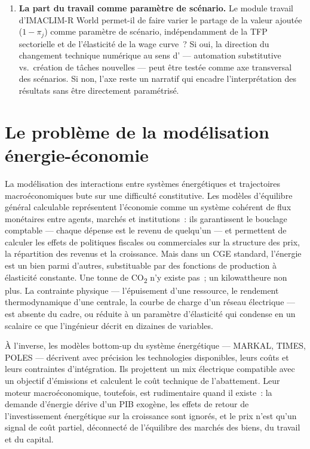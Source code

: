 \begin{enumerate}
\item \textbf{La part du travail comme paramètre de scénario.} Le module travail d'IMACLIM-R World permet-il de faire varier le partage de la valeur ajoutée ($1-\pi_j$) comme paramètre de scénario, indépendamment de la TFP sectorielle et de l'élasticité de la wage curve~? Si oui, la direction du changement technique numérique au sens d'\textcite{acemoglu_building_2026} --- automation substitutive vs.\ création de tâches nouvelles --- peut être testée comme axe transversal des scénarios. Si non, l'axe reste un narratif qui encadre l'interprétation des résultats sans être directement paramétrisé.
\end{enumerate}


\section{Le problème de la modélisation énergie-économie}\label{sec:imaclim-probleme}

La modélisation des interactions entre systèmes énergétiques et trajectoires macroéconomiques bute sur une difficulté constitutive. Les modèles d'équilibre général calculable représentent l'économie comme un système cohérent de flux monétaires entre agents, marchés et institutions~: ils garantissent le bouclage comptable --- chaque dépense est le revenu de quelqu'un --- et permettent de calculer les effets de politiques fiscales ou commerciales sur la structure des prix, la répartition des revenus et la croissance. Mais dans un CGE standard, l'énergie est un bien parmi d'autres, substituable par des fonctions de production à élasticité constante. Une tonne de CO\textsubscript{2} n'y existe pas~; un kilowattheure non plus. La contrainte physique --- l'épuisement d'une ressource, le rendement thermodynamique d'une centrale, la courbe de charge d'un réseau électrique --- est absente du cadre, ou réduite à un paramètre d'élasticité qui condense en un scalaire ce que l'ingénieur décrit en dizaines de variables.

À l'inverse, les modèles bottom-up du système énergétique --- MARKAL, TIMES, POLES --- décrivent avec précision les technologies disponibles, leurs coûts et leurs contraintes d'intégration. Ils projettent un mix électrique compatible avec un objectif d'émissions et calculent le coût technique de l'abattement. Leur moteur macroéconomique, toutefois, est rudimentaire quand il existe~: la demande d'énergie dérive d'un PIB exogène, les effets de retour de l'investissement énergétique sur la croissance sont ignorés, et le prix n'est qu'un signal de coût partiel, déconnecté de l'équilibre des marchés des biens, du travail et du capital.

